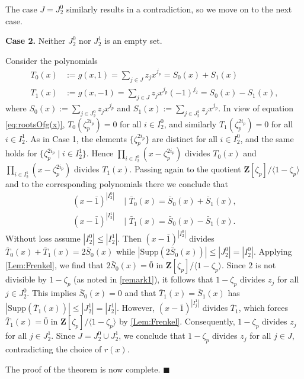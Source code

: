 \documentclass[a4paper,12pt,reqno]{amsart}
\newenvironment{proofofA}{{\bf {Proof of Theorem \ref{Thm:A}.} }}{\hfill $\blacksquare$ \\}
\def\Z{\mathbf{Z}}
\def\Supp{\mathrm{Supp}}
\begin{document}
\begin{proofofA}
The case $J = J_2^0$ similarly results in a contradiction, so we move on to the next case.

{\bf Case 2. }
Neither $J_2^0$ nor $J_2^1$ is an empty set.

Consider the polynomials 
\begin{align}
T_0(x)&:=g(x,1)= \sum_{j \in J}  z_j x^{j_p}= S_0(x) +S_1(x)\\
T_1(x)&:=g(x,-1)= \sum_{j \in J}  z_j x^{j_p} (-1)^{j_2}=S_0(x) - S_1(x), 
\end{align}
where $S_0(x):= \sum_{j \in J_2^0}  z_j x^{j_p}$ and $S_1(x):= \sum_{j \in J_2^1}  z_j x^{j_p}$. 
In view of equation \eqref{eq:rootsOfg(x)},  
$T_0(\zeta_p^{2i_p}) = 0$ for all $i \in I_2^0$, 
and similarly $T_1(\zeta_p^{2i_p})= 0$ for all $i \in I_2^1$. As in Case 1, the elements $\{\zeta_p^{2i_p}\} $ are distinct for all $i \in I_2^0$,
and the same holds for $\{ \zeta_p^{2i_p} \mid i \in I_2^1\}$.    Hence $\prod_{i \in I_2^0}(x- \zeta_p^{2i_p})$ divides  $T_0(x)$ and $\prod_{i \in I_2^1}(x- \zeta_p^{2i_p})$ divides  $T_1(x)$.  Passing again to the quotient  $\Z[\zeta_p]/\langle 1 - \zeta_p \rangle $ and to the corresponding polynomials there  we conclude that 
\begin{align}
(x-\bar{1})^{|I_2^0|}\, \,  & \big| \, \,   \bar{T}_0(x) =  \bar{S}_0(x) + \bar{S}_1(x), \\ 
(x-\bar{1})^{|I_2^1|}\, \,  & \big| \, \,   \bar{T}_1(x) =  \bar{S}_0(x) - \bar{S}_1(x).
\end{align}
Without loss assume $|I_2^0 | \leq |I_2^1|$. Then 
$(x-\bar{1})^{|I_2^0|}$ divides $\bar{T}_0(x) +\bar{T}_1(x)= 2 \bar{S}_0(x)$ while $|\Supp(2\bar{S}_0(x))|  \leq |J_2^0|= |I_2^0|$. 
Applying \autoref{Lem:Frenkel}, we find that $2 \bar{S}_0(x) = \bar{0}$ in $\Z[\zeta_p]/\langle 1 - \zeta_p \rangle$. Since $2$ is not divisible by $1 - \zeta_p$ (as noted in \autoref{remark1}), it follows that $1 - \zeta_p$ divides $z_j$ for all $j \in J_2^0$. This implies $\bar{S}_0(x) = 0$ and that $\bar{T}_1(x) = \bar{S}_1(x)$ has $|\Supp(\bar{T}_1(x))| \leq |J_2^1| = |I_2^1|$. However, $(x - \bar{1})^{|I_j^1|}$ divides $\bar{T}_1$, which forces $\bar{T}_1(x) = \bar{0}$ in $\Z[\zeta_p]/\langle 1 - \zeta_p \rangle$ by \autoref{Lem:Frenkel}. Consequently, $1 - \zeta_p$ divides $z_j$ for all $j \in J_2^1$. Since $J = J_2^0 \cup J_2^1$, we conclude that $1 - \zeta_p$ divides $z_j$ for all $j \in J$, contradicting the choice of $r(x)$. 

The proof of the theorem is now complete.
\end{proofofA}
\end{document}
